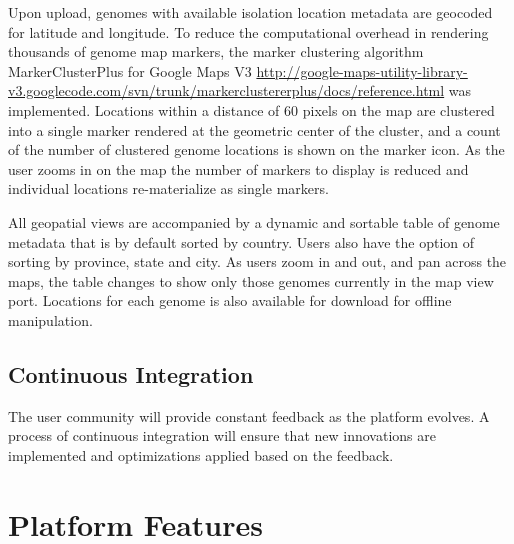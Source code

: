 \documentclass[doublespacing, linenumbers]{bmcart}
\begin{document}
Upon upload, genomes with available isolation location metadata are geocoded for latitude and longitude. To reduce the computational overhead in  rendering thousands of genome map markers, the marker clustering algorithm MarkerClusterPlus for Google Maps V3 \url{http://google-maps-utility-library-v3.googlecode.com/svn/trunk/markerclustererplus/docs/reference.html} was implemented. Locations within a distance of 60 pixels on the map are clustered into a single marker rendered at the geometric center of the cluster, and a count of the number of clustered genome locations is shown on the marker icon. As the user zooms in on the map the number of markers to display is reduced and individual locations re-materialize as single markers.

All geopatial views are accompanied by a dynamic and sortable table of genome metadata that is by default sorted by country. Users also have the option of sorting by province, state and city. As users zoom in and out, and pan across the maps, the table changes to show only those genomes currently in the map view port. Locations for each genome is also available for download for offline manipulation.

\subsection{Continuous Integration}
The user community will provide constant feedback as the platform evolves. A process of continuous integration will ensure that new innovations are implemented and optimizations applied based on the feedback.

\section{Platform Features}
\end{document}
